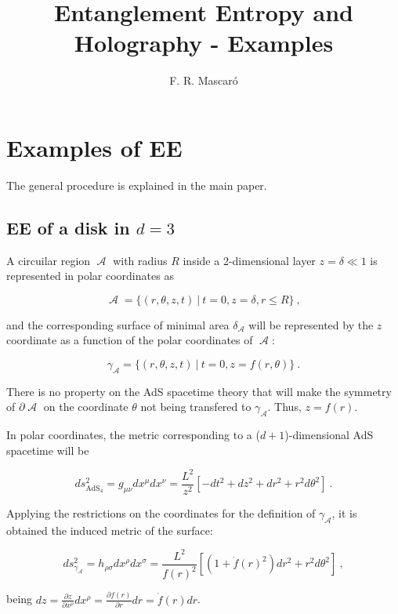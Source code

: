 \documentclass[lettersize,journal]{IEEEtran}
\title{Entanglement Entropy and Holography - Examples}
\author{F. R. Mascaró}
\date{}
\providecommand{\eq}[2]{
    \begin{equation}
        #2
    \label{eq:#1}
    \end{equation}
}
\DeclareMathOperator{\calA}{\mathcal{A}}
\begin{document}
\maketitle{}




\section{Examples of EE}

The general procedure is explained in the main paper.


\subsection{EE of a disk in $d=3$}

A circuilar region $\calA$ with radius $R$ inside a 2-dimensional layer $z = \delta \ll 1$ is represented in polar coordinates as
\eq{1A}{
    \calA = \{ ( r, \theta, z, t ) \ | \ t = 0, z = \delta, r \le R \} \ ,
}
and the corresponding surface of minimal area $\delta_{\calA}$ will be represented by the $z$ coordinate as a function of the polar coordinates of $\calA$:
\eq{1gammaA}{
    \gamma_{\calA} = \{ ( r, \theta, z, t ) \ | \ t = 0, z = f (r, \theta) \} \ .
}
There is no property on the AdS spacetime theory that will make the symmetry of $\partial \calA$ on the coordinate $\theta$ not being transfered to $\gamma_{\calA}$. Thus, $z = f (r)$.

In polar coordinates, the metric corresponding to a ($d+1$)-dimensional AdS spacetime will be
\eq{1Ametric}{
    ds^2_{\text{AdS}_4} = g_{\mu \nu} dx^\mu dx^\nu = 
    \frac{L^2}{z^2} [ -dt^2 + dz^2 + dr^2 + r^2 d\theta^2 ] \ .
}

Applying the restrictions on the coordinates for the definition of $\gamma_{\calA}$, it is obtained the induced metric of the surface:
\eq{1gammaAmetric}{
    ds^2_{\gamma_{\calA}} = h_{\rho \sigma} dx^\rho dx^\sigma = 
    \frac{L^2}{f(r)^2} \left[ \left( 1+ \dot{f}(r)^2 \right) dr^2 + r^2 d\theta^2 \right] \ ,
}
being $dz = \frac{\partial z}{\partial x^\rho} dx^\rho = \frac{\partial f(r)}{\partial r} dr = \dot{f}(r) dr$.
\end{document}
